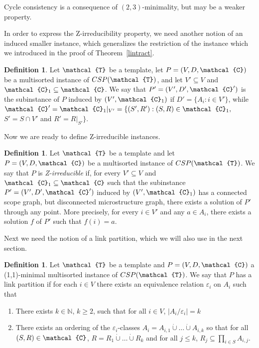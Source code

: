 \documentclass[11pt]{amsart}
\newcommand{\vr}[1]{{\uppercase {\mathcal{#1}}}}
\theoremstyle{definition}
\newtheorem{df}[thm]{Definition}
\begin{document}
Cycle consistency is a consequence of $(2,3)$-minimality, but may be a weaker property. 

In order to express the Z-irreducibility property, we need another notion of an induced smaller instance, which generalizes the restriction of the instance which we introduced in the proof of Theorem~\ref{lintract}.

\begin{df}\label{inducedsubinstance} Let $\vr t$ be a template, let $P=(V,D,\vr c)$ be a multisorted instance of $CSP(\vr t)$, and let $V'\subseteq V$ and $\vr c_1\subseteq \vr c$. We say that $P'=(V',D',\vr c')$ is the subinstance of $P$ induced by $(V',\vr c_1)$ if $D'=\{A_i:i\in V'\}$, while $\vr c'=\vr c_1|_{V'}=\{(S',R'): (S,R)\in \vr c_1,$ $S'=S\cap V'$ and $R'=R|_{S'}\}$.
\end{df}

Now we are ready to define Z-irreducible instances.

\begin{df}\label{Zirred}
Let $\vr t$ be a template and let $P=(V,D,\vr c)$ be a multisorted instance of $CSP(\vr t)$. We say that $P$ is {\em Z-irreducible} if, for every $V'\subseteq V$ and $\vr c_1\subseteq\vr c$ such that the subinstance $P'=(V',D',\vr c')$ induced by $(V',\vr c_1)$ has a connected scope graph, but disconnected microstructure graph, there exists a solution of $P'$ through any point. More precisely, for every $i\in V'$ and any $a\in A_i$, there exists a solution $f$ of $P'$ such that $f(i)=a$.
\end{df}

Next we need the notion of a link partition, which we will also use in the next section.

\begin{df}\label{linkdef}
Let $\vr t$ be a template and $P=(V,D,\vr c)$ a (1,1)-minimal multisorted instance of $CSP(\vr t)$. We say that $P$ has a link partition if for each $i\in V$ there exists an equivalence relation $\varepsilon_i$ on $A_i$ such that 
\begin{enumerate}
\item There exists $k\in\mathbb{N}$, $k\geq 2$, such that for all $i\in V$, $|A_i/\varepsilon_i|=k$
\item There exists an ordering of the $\varepsilon_i$-classes $A_i=A_{i,1}\dot{\cup}\dots\dot{\cup}A_{i,k}$ so that for all $(S,R)\in \vr c$, $R=R_1\dot{\cup}\dots\dot{\cup}R_k$ and for all $j\leq k$, $R_j\subseteq \prod\limits_{i\in S}A_{i,j}$. 
\end{enumerate}
\end{df}
\end{document}
